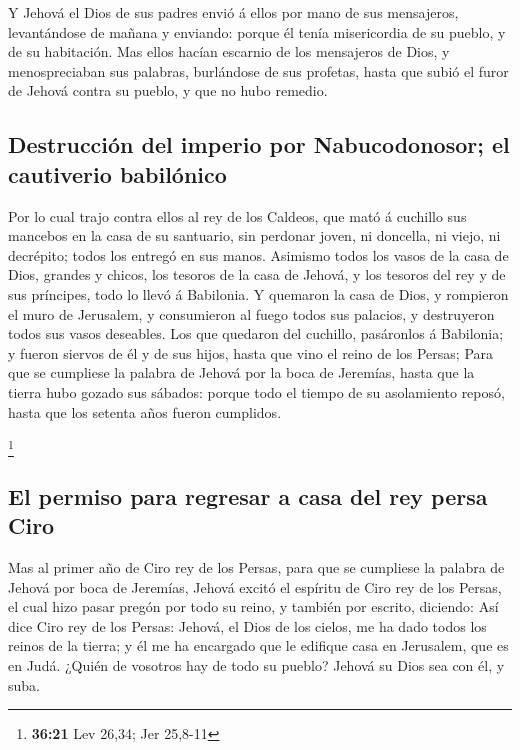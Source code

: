  Y Jehová el Dios de sus padres envió á ellos por mano de
sus mensajeros, levantándose de mañana y enviando: porque él tenía
misericordia de su pueblo, y de su habitación.  Mas ellos
hacían escarnio de los mensajeros de Dios, y menospreciaban sus
palabras, burlándose de sus profetas, hasta que subió el furor de Jehová
contra su pueblo, y que no hubo remedio.

\hypertarget{destrucciuxf3n-del-imperio-por-nabucodonosor-el-cautiverio-babiluxf3nico}{%
\subsection{Destrucción del imperio por Nabucodonosor; el cautiverio
babilónico}\label{destrucciuxf3n-del-imperio-por-nabucodonosor-el-cautiverio-babiluxf3nico}}

 Por lo cual trajo contra ellos al rey de los Caldeos,
que mató á cuchillo sus mancebos en la casa de su santuario, sin
perdonar joven, ni doncella, ni viejo, ni decrépito; todos los entregó
en sus manos.  Asimismo todos los vasos de la casa de
Dios, grandes y chicos, los tesoros de la casa de Jehová, y los tesoros
del rey y de sus príncipes, todo lo llevó á Babilonia.  Y
quemaron la casa de Dios, y rompieron el muro de Jerusalem, y
consumieron al fuego todos sus palacios, y destruyeron todos sus vasos
deseables.  Los que quedaron del cuchillo, pasáronlos á
Babilonia; y fueron siervos de él y de sus hijos, hasta que vino el
reino de los Persas;  Para que se cumpliese la palabra de
Jehová por la boca de Jeremías, hasta que la tierra hubo gozado sus
sábados: porque todo el tiempo de su asolamiento reposó, hasta que los
setenta años fueron cumplidos.

\footnote{\textbf{36:21} Lev 26,34; Jer 25,8-11}

\hypertarget{el-permiso-para-regresar-a-casa-del-rey-persa-ciro}{%
\subsection{El permiso para regresar a casa del rey persa
Ciro}\label{el-permiso-para-regresar-a-casa-del-rey-persa-ciro}}

 Mas al primer año de Ciro rey de los Persas, para que se
cumpliese la palabra de Jehová por boca de Jeremías, Jehová excitó el
espíritu de Ciro rey de los Persas, el cual hizo pasar pregón por todo
su reino, y también por escrito, diciendo:  Así dice Ciro
rey de los Persas: Jehová, el Dios de los cielos, me ha dado todos los
reinos de la tierra; y él me ha encargado que le edifique casa en
Jerusalem, que es en Judá. ¿Quién de vosotros hay de todo su pueblo?
Jehová su Dios sea con él, y suba.
